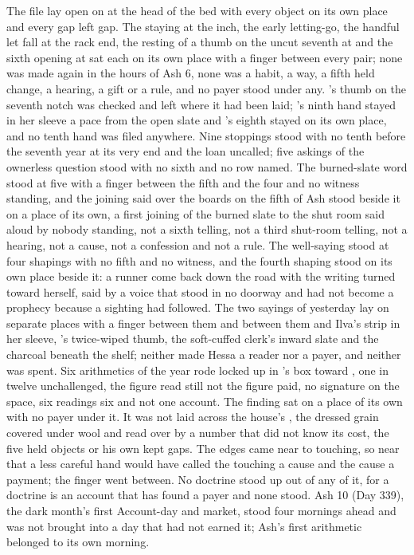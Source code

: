 The file lay open on  at the head of the bed with every object on its own place and every gap left gap. The staying at the inch, the early letting-go, the handful let fall at the rack end, the resting of a thumb on the uncut seventh at  and the sixth opening at  sat each on its own place with a finger between every pair; none was made again in the hours of Ash 6, none was a habit, a way, a fifth held change, a hearing, a gift or a rule, and no payer stood under any. 's thumb on the seventh notch was checked and left where it had been laid; 's ninth hand stayed in her sleeve a pace from the open slate and 's eighth stayed on its own place, and no tenth hand was filed anywhere. Nine stoppings stood with no tenth before the seventh year at its very end and the loan uncalled; five askings of the ownerless question stood with no sixth and no row named. The burned-slate word stood at five with a finger between the fifth and the four and no witness standing, and the joining said over the boards on the fifth of Ash stood beside it on a place of its own, a first joining of the burned slate to the shut room said aloud by nobody standing, not a sixth telling, not a third shut-room telling, not a hearing, not a cause, not a confession and not a rule. The well-saying stood at four shapings with no fifth and no witness, and the fourth shaping stood on its own place beside it: a runner come back down the road with the writing turned toward herself, said by a voice that stood in no doorway and had not become a prophecy because a sighting had followed. The two sayings of yesterday lay on separate places with a finger between them and between them and Ilva's strip in her sleeve, 's twice-wiped thumb, the soft-cuffed clerk's inward slate and the charcoal beneath the shelf; neither made Hessa a reader nor  a payer, and neither was spent. Six arithmetics of the year rode locked up  in 's box toward , one in twelve unchallenged, the figure read still not the figure paid, no signature on the space, six readings six and not one account. The finding sat on a place of its own with no payer under it. It was not laid across the house's , the dressed grain covered under wool and read over by a number that did not know its cost, the five held objects or his own kept gaps. The edges came near to touching, so near that a less careful hand would have called the touching a cause and the cause a payment; the finger went between. No doctrine stood up out of any of it, for a doctrine is an account that has found a payer and none stood. Ash 10 (Day 339), the dark month's first Account-day and market, stood four mornings ahead and was not brought into a day that had not earned it; Ash's first arithmetic belonged to its own morning.

